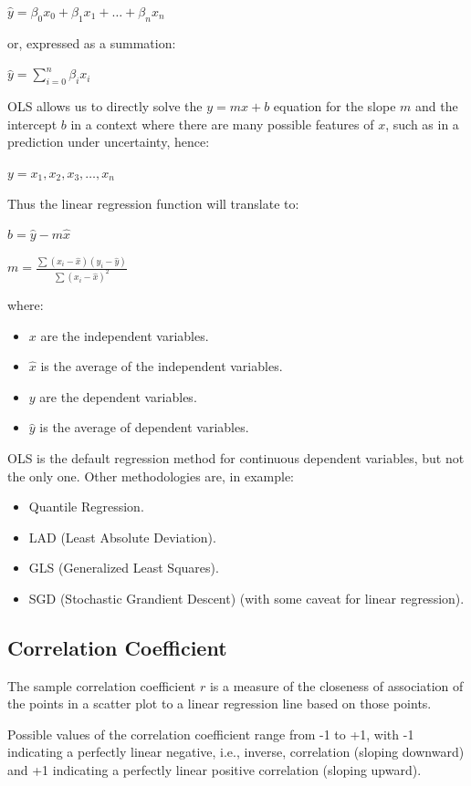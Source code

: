 \documentclass{article}
\begin{document}
$\hat{y} = \beta_0 x_0 + \beta_1 x_1 + \ldots + \beta_n x_n$

or, expressed as a summation:

$ \displaystyle \hat{y} = \sum \limits^{n}_{i=0}{\beta_i x_i}$

OLS allows us to directly solve the $y = mx + b$ equation for the slope $m$ and the intercept $b$ in a context where there are many possible features of $x$, such as in a prediction under uncertainty, hence:

$ \displaystyle {y = x_1, x_2, x_3, \ldots, x_n}$

Thus the linear regression function will translate to:

$b = \hat{y} - m\hat{x}$

$m = \displaystyle \frac{\sum(x_i - \hat{x})(y_i - \hat{y})}{\sum(x_i - \hat{x})^2}$

where:
\begin{itemize}
    \item $x$ are the independent variables.
    \item $\hat{x}$ is the average of the independent variables.
    \item $y$ are the dependent variables.
    \item $\hat{y}$ is the average of dependent variables.
\end{itemize}


OLS is the default regression method for continuous dependent variables, but not the only one.
Other methodologies are, in example:
\begin{itemize}
    \item Quantile Regression.
    \item LAD (Least Absolute Deviation).
    \item GLS (Generalized Least Squares).
    \item SGD (Stochastic Grandient Descent) (with some caveat for linear regression).
\end{itemize}

\subsection{Correlation Coefficient}
The sample correlation coefficient $r$ is a measure of the closeness of association of the points in a scatter plot to a linear regression line based on those points.

Possible values of the correlation coefficient range from -1 to +1, with -1 indicating a perfectly linear negative, i.e., inverse, correlation (sloping downward) and +1 indicating a perfectly linear positive correlation (sloping upward).
\end{document}

